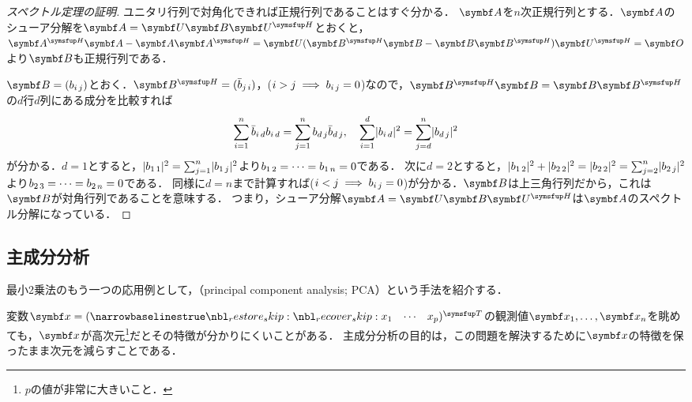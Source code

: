 \documentclass[../../main]{subfiles}
\begin{document}
\begin{proof}[スペクトル定理の証明]
  ユニタリ行列で対角化できれば正規行列であることはすぐ分かる．
  \(\mat{A}\)を\(n\)次正規行列とする．\(\mat{A}\)のシューア分解を\(\mat{A}=\mat{U}\mat{B}\htrps{\mat{U}}\)とおくと，
  \(\htrps{\mat{A}}\mat{A}-\mat{A}\htrps{\mat{A}}=\mat{U}(\htrps{\mat{B}}\mat{B}-\mat{B}\htrps{\mat{B}})\htrps{\mat{U}}=\zmat\)より\(\mat{B}\)も正規行列である．

  \(\mat{B}=\matfence{\midx{b}{i}{j}}\)とおく．\(\htrps{\mat{B}}=\matfence{\midx{\conj{b}}{j}{i}}\)，(\(i>j\implies b_{i\,j}=0\))なので，\(\htrps{\mat{B}}\mat{B}=\mat{B}\htrps{\mat{B}}\)の\(d\)行\(d\)列にある成分を比較すれば
  \[
    \sum_{i=1}^n\midx{\conj{b}}{i}{d}\midx{b}{i}{d} = \sum_{j=1}^n\midx{b}{d}{j}\midx{\conj{b}}{d}{j},
    \quad\sum_{i=1}^d\abs{\midx{b}{i}{d}}^2 = \sum_{j=d}^n\abs{\midx{b}{d}{j}}^2
  \]
  が分かる．\(d=1\)とすると，\(\lvert b_{1\,1}\rvert^2=\sum_{j=1}^n\lvert b_{1\,j}\rvert^2\)より\(b_{1\,2}=\dots=b_{1\,n}=0\)である．
  次に\(d=2\)とすると，\(\lvert b_{1\,2}\rvert^2+\lvert b_{2\,2}\rvert^2=\lvert b_{2\,2}\rvert^2=\sum_{j=2}^n\lvert b_{2\,j}\rvert^2\)より\(b_{2\,3}=\dots=b_{2\,n}=0\)である．
  同様に\(d=n\)まで計算すれば(\(i<j\implies b_{i\,j}=0\))が分かる．\(\mat{B}\)は上三角行列だから，これは\(\mat{B}\)が対角行列であることを意味する．
  つまり，シューア分解\(\mat{A}=\mat{U}\mat{B}\htrps{\mat{U}}\)は\(\mat{A}\)のスペクトル分解になっている．
\end{proof}

\subsection{主成分分析}

最小2乗法のもう一つの応用例として，（principal component analysis; PCA）という手法を紹介する．

変数\(\vect{x}=\trps{\rowvect{x_1 & \cdots & x_p}}\)の観測値\(\vect{x}_1,\dots,\vect{x}_n\)を眺めても，\(\vect{x}\)が高次元\footnote{\(p\)の値が非常に大きいこと．}だとその特徴が分かりにくいことがある．
主成分分析の目的は，この問題を解決するために\(\vect{x}\)の特徴を保ったまま次元を減らすことである．
\end{document}
